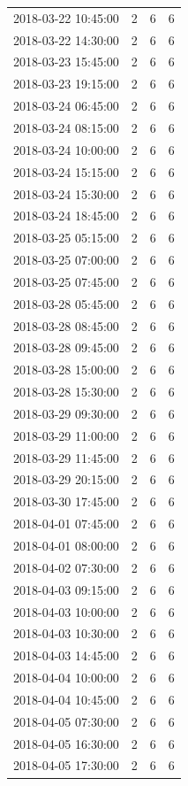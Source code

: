\begin{tabular}{lrrr}
2018-03-22 10:45:00 & 2 & 6 & 6 \\
2018-03-22 14:30:00 & 2 & 6 & 6 \\
2018-03-23 15:45:00 & 2 & 6 & 6 \\
2018-03-23 19:15:00 & 2 & 6 & 6 \\
2018-03-24 06:45:00 & 2 & 6 & 6 \\
2018-03-24 08:15:00 & 2 & 6 & 6 \\
2018-03-24 10:00:00 & 2 & 6 & 6 \\
2018-03-24 15:15:00 & 2 & 6 & 6 \\
2018-03-24 15:30:00 & 2 & 6 & 6 \\
2018-03-24 18:45:00 & 2 & 6 & 6 \\
2018-03-25 05:15:00 & 2 & 6 & 6 \\
2018-03-25 07:00:00 & 2 & 6 & 6 \\
2018-03-25 07:45:00 & 2 & 6 & 6 \\
2018-03-28 05:45:00 & 2 & 6 & 6 \\
2018-03-28 08:45:00 & 2 & 6 & 6 \\
2018-03-28 09:45:00 & 2 & 6 & 6 \\
2018-03-28 15:00:00 & 2 & 6 & 6 \\
2018-03-28 15:30:00 & 2 & 6 & 6 \\
2018-03-29 09:30:00 & 2 & 6 & 6 \\
2018-03-29 11:00:00 & 2 & 6 & 6 \\
2018-03-29 11:45:00 & 2 & 6 & 6 \\
2018-03-29 20:15:00 & 2 & 6 & 6 \\
2018-03-30 17:45:00 & 2 & 6 & 6 \\
2018-04-01 07:45:00 & 2 & 6 & 6 \\
2018-04-01 08:00:00 & 2 & 6 & 6 \\
2018-04-02 07:30:00 & 2 & 6 & 6 \\
2018-04-03 09:15:00 & 2 & 6 & 6 \\
2018-04-03 10:00:00 & 2 & 6 & 6 \\
2018-04-03 10:30:00 & 2 & 6 & 6 \\
2018-04-03 14:45:00 & 2 & 6 & 6 \\
2018-04-04 10:00:00 & 2 & 6 & 6 \\
2018-04-04 10:45:00 & 2 & 6 & 6 \\
2018-04-05 07:30:00 & 2 & 6 & 6 \\
2018-04-05 16:30:00 & 2 & 6 & 6 \\
2018-04-05 17:30:00 & 2 & 6 & 6 \\

\end{tabular}
